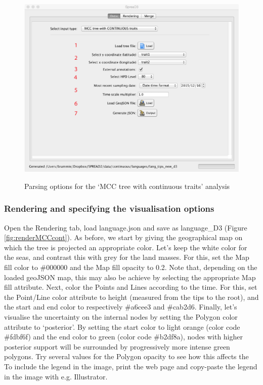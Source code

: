 \documentclass[english]{paper}
\begin{document}
\begin{figure}%
\centering
\includegraphics[width=1\textwidth]{./figures/new_parse_cont_language.pdf} %
\label{fig:parseMCCcont}
\caption{Parsing options for the `MCC tree with continuous traits' analysis}
\end{figure}

\subsubsection{Rendering and specifying the visualisation options}

Open the Rendering tab, load language.json and save as language\_D3 (Figure \ref{fig:renderMCCcont}).
As before, we start by giving the geographical map on which the tree is projected an appropriate color. 
Let's keep the white color for the seas, and contrast this with grey for the land masses. %
For this, set the Map fill color to \#000000 and the Map fill opacity to 0.2. 
Note that, depending on the loaded geoJSON map, this may also be achieve by selecting the appropriate Map fill attribute. 
Next, color the Points and Lines according to the time.
For this, set the Point/Line color attribute to height (measured from the tips to the root), and the start and end color to respectively \#a6cee3 and \#cab2d6.
Finally, let's visualise the uncertainty on the internal nodes by setting the Polygon color attribute to `posterior'.
By setting the start color to light orange (color code \#fdbf6f) and the end color to green (color code \#b2df8a), nodes with higher posterior support will be surrounded by progressively more intense green polygons.
Try several values for  the Polygon opacity to see how this affects the 
To include the legend in the image, print the web page and copy-paste the legend in the image with e.g. Illustrator. 
\end{document}
